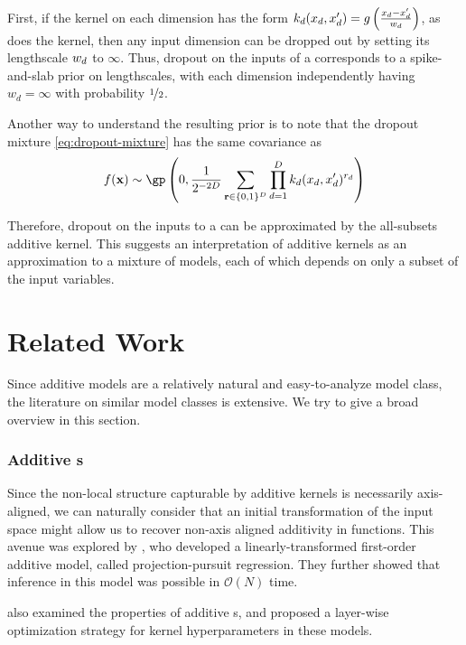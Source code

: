 First, if the kernel on each dimension has the form ${k_d(x_d, x_d') = g \left( \frac{x_d - x_d'}{w_d} \right)}$, as does the \kSE{} kernel, then any input dimension can be dropped out by setting its lengthscale $w_d$ to $\infty$.
Thus, dropout on the inputs of a \gp{} corresponds to a spike-and-slab prior on lengthscales, with each dimension independently having $w_d = \infty$ with probability $\nicefrac{1}{2}$.

Another way to understand the resulting prior is to note that the dropout mixture \eqref{eq:dropout-mixture} has the same covariance as
\begin{align}
f(\vx) \sim \textnormal{\gp} \left(0, \frac{1}{2^{-2D}} \sum_{\vr \in \{0,1\}^D}  \prod_{d=1}^D k_d(x_d, x_d')^{r_d} \right)
\label{eq:additive-gps}
\end{align}

Therefore, dropout on the inputs to a \gp{} can be approximated by the all-subsets additive kernel.
This suggests an interpretation of additive kernels as an approximation to a mixture of models, each of which depends on only a subset of the input variables.


\section{Related Work}

Since additive models are a relatively natural and easy-to-analyze model class, the literature on similar model classes is extensive.
We try to give a broad overview in this section.

\subsubsection{Additive \sgp{}s}

Since the non-local structure capturable by additive kernels is necessarily axis-aligned, we can naturally consider that an initial transformation of the input space might allow us to recover non-axis aligned additivity in functions.
This avenue was explored by \citet{gilboa2013scaling}, who developed a linearly-transformed first-order additive \gp{} model, called projection-pursuit \gp{} regression.  They further showed that inference in this model was possible in $\mathcal{O}(N)$ time.

\citet{durrande2011additive} also examined the properties of additive \gp{}s, and proposed a layer-wise optimization strategy for kernel hyperparameters in these models.

